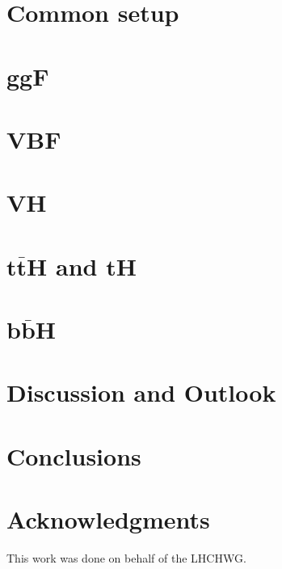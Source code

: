 \documentclass{SciPost_better_arXiv}
\begin{document}
\section{Common setup}
\label{sec:setup}


\section{ggF}
\label{sec:ggF}


\section{VBF}
\label{sec:VBF}


\section{VH}
\label{sec:VH}


\section{\texorpdfstring{$\boldsymbol{t\bar{t}H}$}{ttH} and \texorpdfstring{$\boldsymbol{tH}$}{tH}}
\label{sec:ttH}


\section{\texorpdfstring{$\boldsymbol{b\bar{b}H}$}{bbH}}
\label{sec:bbH}

\FloatBarrier
\section{Discussion and Outlook}
\label{sec:Outlook}

\clearpage
\section{Conclusions}
\label{sec:conclusions}


\section*{Acknowledgments}
This work was done on behalf of the LHCHWG.
\end{document}
